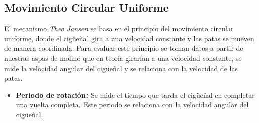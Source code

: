 \begin{multicols}{2}
  \subsection{Movimiento Circular Uniforme}

El mecanismo \textit{Theo Jansen} se basa en el principio del movimiento circular uniforme, donde el cigüeñal gira a una velocidad constante y las patas se mueven de manera coordinada. Para evaluar este principio se toman datos a partir de nuestras aspas de molino que en teoría girarían a una velocidad constante, se mide la velocidad angular del cigüeñal y se relaciona con la velocidad de las patas.

\begin{itemize}
  \item \textbf{Periodo de rotación:} Se mide el tiempo que tarda el cigüeñal en completar una vuelta completa. Este periodo se relaciona con la velocidad angular del cigüeñal.
  


\end{itemize}
\end{multicols}
